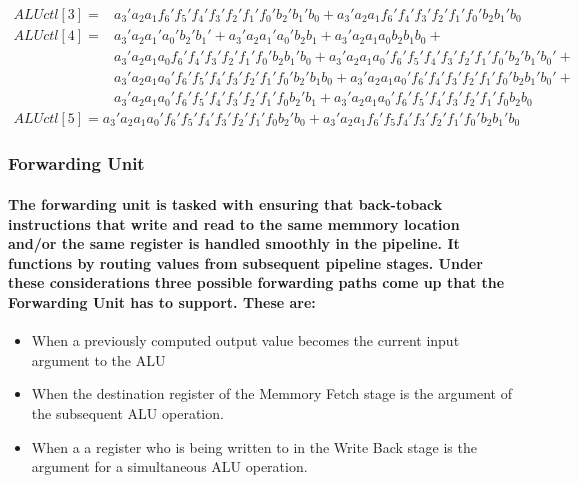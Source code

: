 \documentclass[12pt,a4paper]{report}
\begin{document}
\begin{equation}
\begin{aligned}
ALUctl[3] = & a_3'a_2a_1f_6'f_5'f_4'f_3'f_2'f_1'f_0'b_2'b_1'b_0 + a_3'a_2a_1f_6'f_4'f_3'f_2'f_1'f_0'b_2b_1'b_0
\end{aligned}
\label{eq:aluctl3}
\end{equation}
\begin{equation}
\begin{aligned}
ALUctl[4] = & a_3'a_2a_1'a_0'b_2'b_1' + a_3'a_2a_1'a_0'b_2b_1 + 
 a_3'a_2a_1a_0b_2b_1b_0 +\\
& a_3'a_2a_1a_0f_6'f_4'f_3'f_2'f_1'f_0'b_2b_1'b_0 + 
 a_3'a_2a_1a_0'f_6'f_5'f_4'f_3'f_2'f_1'f_0'b_2'b_1'b_0' +\\
 &  a_3'a_2a_1a_0'f_6'f_5'f_4'f_3'f_2'f_1'f_0'b_2'b_1b_0 + 
a_3'a_2a_1a_0'f_6'f_4'f_3'f_2'f_1'f_0'b_2b_1'b_0' +\\
&  a_3'a_2a_1a_0'f_6'f_5'f_4'f_3'f_2'f_1'f_0b_2'b_1 +  a_3'a_2a_1a_0'f_6'f_5'f_4'f_3'f_2'f_1'f_0b_2b_0
\end{aligned}
\label{eq:aluctl4}
\end{equation}
\begin{equation}
\begin{aligned}
ALUctl[5] =  a_3'a_2a_1a_0'f_6'f_5'f_4'f_3'f_2'f_1'f_0b_2'b_0 +  a_3'a_2a_1f_6'f_5f_4'f_3'f_2'f_1'f_0'b_2b_1'b_0
\end{aligned}
\label{eq:aluctl5}
\end{equation}
\subsubsection{Forwarding Unit}
\paragraph{\textrm{\textmd{The forwarding unit is tasked with ensuring that back-toback instructions that write and read to the same memmory location and/or the same register is handled smoothly in the pipeline. It functions by routing values from subsequent pipeline stages. Under these considerations three possible forwarding paths come up that the Forwarding Unit has to support. These are:}}}
\begin{itemize}
\item When a previously computed output value becomes the current input argument to the ALU
\item When the destination register of the Memmory Fetch stage is the argument of the subsequent ALU operation.
\item When a a register who is being written to in the Write Back stage is the argument for a simultaneous ALU operation.
\end{itemize}
\end{document}

